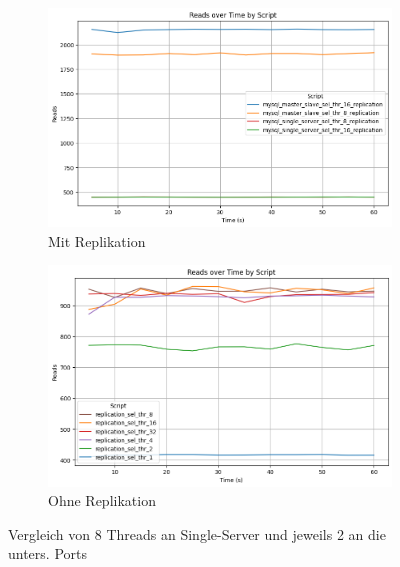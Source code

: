 \vspace{-8pt}
\begin{figure}[H]
  \centering
  \begin{subfigure}[t]{0.48\textwidth}
    \includegraphics[width=\textwidth]{PNGs/Script/Replication/replication-multiple-select-threads/Reads}
    \caption{Mit Replikation}
    \label{replication-multiple-select-threads-reads}
  \end{subfigure}
  \hfill
  \begin{subfigure}[t]{0.48\textwidth}
    \includegraphics[width=\textwidth]{PNGs/Script/Replication/replication-no-multiple-select-threads/Reads}
    \caption{Ohne Replikation}
    \label{replication-no-multiple-select-threads-reads}
  \end{subfigure}
  \vspace{-5pt}
  \caption[Replikation: Threadanzahl aufgeteilt an Master-Replikate]{Vergleich von 8 Threads an Single-Server und jeweils 2 an die unters. Ports }
  \label{fig:replication-multiple-select-threads}
\end{figure}
\vspace{-20pt}


